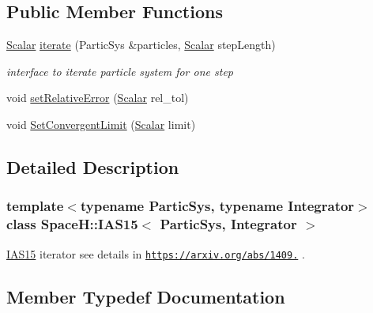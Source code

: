 \subsection*{Public Member Functions}
\begin{DoxyCompactItemize}
\item 
\mbox{\hyperlink{class_space_h_1_1_i_a_s15_ac4ee5f40852d7b500ca50084eb35b012}{Scalar}} \mbox{\hyperlink{class_space_h_1_1_i_a_s15_a60d1a4d8ab5124bf3adc12624f1d7954}{iterate}} (Partic\+Sys \&particles, \mbox{\hyperlink{class_space_h_1_1_i_a_s15_ac4ee5f40852d7b500ca50084eb35b012}{Scalar}} step\+Length)
\begin{DoxyCompactList}\small\item\em interface to iterate particle system for one step \end{DoxyCompactList}\item 
void \mbox{\hyperlink{class_space_h_1_1_i_a_s15_a05a4ea53a8d39fc77fc761f7a8a9864d}{set\+Relative\+Error}} (\mbox{\hyperlink{class_space_h_1_1_i_a_s15_ac4ee5f40852d7b500ca50084eb35b012}{Scalar}} rel\+\_\+tol)
\item 
void \mbox{\hyperlink{class_space_h_1_1_i_a_s15_a7897b1d71c67cd47c5559f6997a9d487}{Set\+Convergent\+Limit}} (\mbox{\hyperlink{class_space_h_1_1_i_a_s15_ac4ee5f40852d7b500ca50084eb35b012}{Scalar}} limit)
\end{DoxyCompactItemize}


\subsection{Detailed Description}
\subsubsection*{template$<$typename Partic\+Sys, typename Integrator$>$\newline
class Space\+H\+::\+I\+A\+S15$<$ Partic\+Sys, Integrator $>$}

\mbox{\hyperlink{class_space_h_1_1_i_a_s15}{I\+A\+S15}} iterator see details in \href{https://arxiv.org/abs/1409.4779}{\tt https\+://arxiv.\+org/abs/1409.} . 



\subsection{Member Typedef Documentation}
\mbox{\label{class_space_h_1_1_i_a_s15_a1eda622ee773ed5b2dff783600e1f7f7}} 
